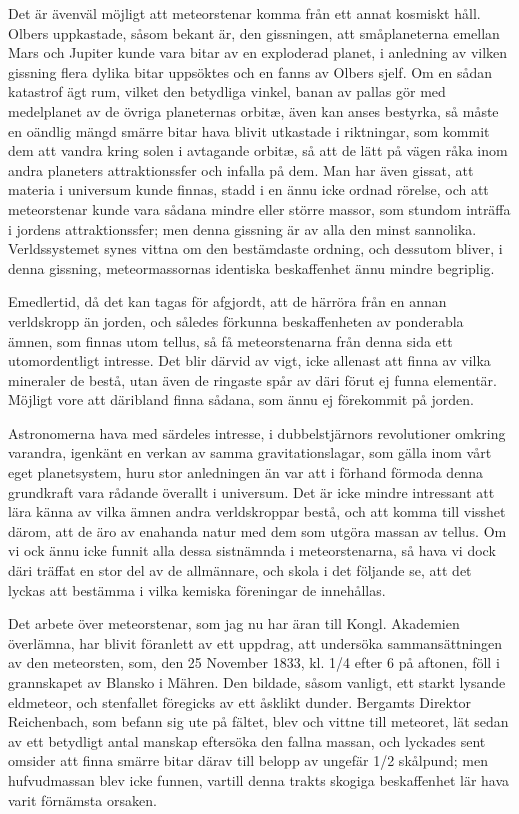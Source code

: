 \documentclass[a4paper, 12pt, oneside, swedish]{article}
\begin{document}
Det är ävenväl möjligt att meteorstenar komma från ett annat kosmiskt håll. Olbers uppkastade, såsom bekant är, den gissningen, att småplaneterna emellan Mars och Jupiter kunde vara bitar av en exploderad planet, i anledning av vilken gissning flera dylika bitar uppsöktes och en fanns av Olbers sjelf. Om en sådan katastrof ägt rum, vilket den betydliga vinkel, banan av pallas gör med medelplanet av de övriga planeternas orbitæ, även kan anses bestyrka, så måste en oändlig mängd smärre bitar hava blivit utkastade i riktningar, som kommit dem att vandra kring solen i avtagande orbitæ, så att de lätt på vägen råka inom andra planeters attraktionssfer och infalla på dem. Man har även gissat, att materia i universum kunde finnas, stadd i en ännu icke ordnad rörelse, och att meteorstenar kunde vara sådana mindre eller större massor, som stundom inträffa i jordens attraktionssfer; men denna gissning är av alla den minst sannolika. Verldssystemet synes vittna om den bestämdaste ordning, och dessutom bliver, i denna gissning, meteormassornas identiska beskaffenhet ännu mindre begriplig.

Emedlertid, då det kan tagas för afgjordt, att de härröra från en annan verldskropp än jorden, och således förkunna beskaffenheten av ponderabla ämnen, som finnas utom tellus, så få meteorstenarna från denna sida ett utomordentligt intresse. Det blir därvid av vigt, icke allenast att finna av vilka mineraler de bestå, utan även de ringaste spår av däri förut ej funna elementär. Möjligt vore att däribland finna sådana, som ännu ej förekommit på jorden.

Astronomerna hava med särdeles intresse, i dubbelstjärnors revolutioner omkring varandra, igenkänt en verkan av samma gravitationslagar, som gälla inom vårt eget planetsystem, huru stor anledningen än var att i förhand förmoda denna grundkraft vara rådande överallt i universum. Det är icke mindre intressant att lära känna av vilka ämnen andra verldskroppar bestå, och att komma till visshet därom, att de äro av enahanda natur med dem som utgöra massan av tellus. Om vi ock ännu icke funnit alla dessa sistnämnda i meteorstenarna, så hava vi dock däri träffat en stor del av de allmännare, och skola i det följande se, att det lyckas att bestämma i vilka kemiska föreningar de innehållas.

Det arbete över meteorstenar, som jag nu har äran till Kongl. Akademien överlämna, har blivit föranlett av ett uppdrag, att undersöka sammansättningen av den meteorsten, som, den 25 November 1833, kl. 1/4 efter 6 på aftonen, föll i grannskapet av Blansko i Mähren. Den bildade, såsom vanligt, ett starkt lysande eldmeteor, och stenfallet föregicks av ett åsklikt dunder. Bergamts Direktor Reichenbach, som befann sig ute på fältet, blev och vittne till meteoret, lät sedan av ett betydligt antal manskap eftersöka den fallna massan, och lyckades sent omsider att finna smärre bitar därav till belopp av ungefär 1/2 skålpund; men hufvudmassan blev icke funnen, vartill denna trakts skogiga beskaffenhet lär hava varit förnämsta orsaken.
\clearpage
\end{document}
